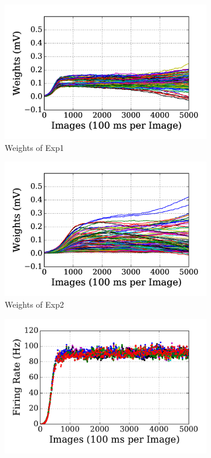 \begin{figure}
	\centering
	\begin{subfigure}[t]{0.45\textwidth}
		\includegraphics[width=\textwidth]{pics_sdlm/00_exp_SAE_Orig/exp1_weights_s.png}
		\caption{Weights of Exp1}
	\end{subfigure}
	\begin{subfigure}[t]{0.45\textwidth}
		\includegraphics[width=\textwidth]{pics_sdlm/00_exp_SAE_Orig/exp2_weights_s.png}
		\caption{Weights of Exp2}
	\end{subfigure}
	\begin{subfigure}[t]{0.45\textwidth}
		\includegraphics[width=\textwidth]{pics_sdlm/00_exp_SAE_Orig/exp1_recon_s.pdf}

\end{subfigure}
\end{figure}

